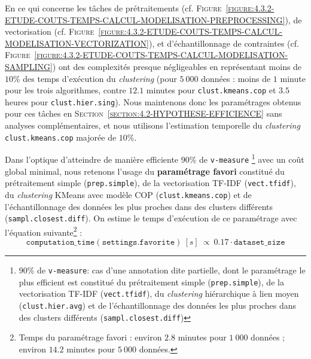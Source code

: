 			En ce qui concerne les tâches de prétraitements (cf. \textsc{Figure~\ref{figure:4.3.2-ETUDE-COUTS-TEMPS-CALCUL-MODELISATION-PREPROCESSING}}), de vectorisation (cf. \textsc{Figure~\ref{figure:4.3.2-ETUDE-COUTS-TEMPS-CALCUL-MODELISATION-VECTORIZATION}}), et d'échantillonnage de contraintes (cf. \textsc{Figure~\ref{figure:4.3.2-ETUDE-COUTS-TEMPS-CALCUL-MODELISATION-SAMPLING}}) ont des complexités presque négligeables en représentant moins de $10$\% des temps d'exécution du \textit{clustering} (pour $5~000$ données : moins de $1$ minute pour les trois algorithmes, contre $12.1$ minutes pour \texttt{clust.kmeans.cop} et $3.5$ heures pour \texttt{clust.hier.sing}).
			Nous maintenons donc les paramétrages obtenus pour ces tâches en \textsc{Section~\ref{section:4.2-HYPOTHESE-EFFICIENCE}} sans analyses complémentaires, et nous utilisons l'estimation temporelle du \textit{clustering} \texttt{clust.kmeans.cop} majorée de $10$\%.
			
			\begin{leftBarSummary}
				Dans l'optique d'atteindre de manière efficiente $90$\% de \texttt{v-measure}
				\footnote{$90$\% de \texttt{v-measure}: cas d'une annotation dite partielle, dont le paramétrage le plus efficient est constitué du prétraitement simple (\texttt{prep.simple}), de la vectorisation TF-IDF (\texttt{vect.tfidf}), du \textit{clustering} hiérarchique à lien moyen (\texttt{clust.hier.avg}) et de l'échantillonnage des données les plus proches dans des clusters différents (\texttt{sampl.closest.diff})}
				avec un coût global minimal, nous retenons l'usage du \textbf{paramétrage favori} constitué du prétraitement simple (\texttt{prep.simple}), de la vectorisation TF-IDF (\texttt{vect.tfidf}), du \textit{clustering} KMeans avec modèle COP (\texttt{clust.kmeans.cop}) et de l'échantillonnage des données les plus proches dans des clusters différents (\texttt{sampl.closest.diff}).
				On estime le temps d'exécution de ce paramétrage avec l'équation suivante\footnote{Temps du paramétrage favori : environ $2.8$ minutes pour $1~000$ données ; environ $14.2$ minutes pour $5~000$ données.} :
				\begin{equation}
					\label{equation:4.3.2-ETUDE-COUTS-TEMPS-CALCUL-PARAMETRAGE-FAVORI}
					\texttt{computation\_time}(\texttt{settings.favorite})~[s]~
					\propto~0.17 \cdot \texttt{dataset\_size}
				\end{equation}
			\end{leftBarSummary}
	
